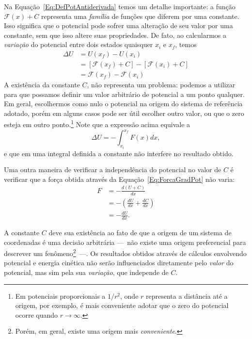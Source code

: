 Na Equação~\eqref{Eq:DefPotAntiderivada} temos um detalhe importante: a função $\mathcal{F}(x) + C$ representa uma \emph{família} de funções que diferem por uma constante. Isso significa que o potencial pode sofrer uma alteração de seu valor por uma constante, sem que isso altere suas propriedades. De fato, ao calcularmos a \emph{variação} do potencial entre dois estados quaisquer $x_i$ e $x_f$, temos
\begin{align}
    \Delta U &= U(x_f) - U(x_i) \\
    &= [\mathcal{F}(x_f) + C] - [\mathcal{F}(x_i) + C] \\
    &= \mathcal{F}(x_f) - \mathcal{F}(x_i)
\end{align}
%
A existência da constante $C$, não representa um problema: podemos a utilizar para que possamos definir um valor arbitrário de potencial a um ponto qualquer. Em geral, escolhermos como nulo o potencial na origem do sistema de referência adotado, porém em alguns casos pode ser útil escolher outro valor, ou que o zero esteja em outro ponto.\footnote{Em potenciais proporcionais a $1/r^2$, onde $r$ representa a distância até a origem, por exemplo, é mais conveniente adotar que o zero do potencial ocorre quando $r \to \infty$.} Note que a expressão acima equivale a
\begin{equation}
  \Delta U = - \int_{x_i}^{x_f} F(x) dx,
\end{equation}
%
e que em uma integral definida a constante não interfere no resultado obtido.

Uma outra maneira de verificar a independência do potencial no valor de $C$ é verificar que a força obtida através da Equação~\eqref{Eq:ForcaGradPot} não varia:
\begin{align}
  F &= - \frac{d(U+C)}{dx} \\
  &= -\left(\frac{dU}{dx} + \frac{dC}{dx}\right) \\
  &= -\frac{dU}{dx}.
\end{align}

A constante $C$ deve sua existência ao fato de que a origem de um sistema de coordenadas é uma decisão arbitrária ---~não existe uma origem preferencial para descrever um fenômeno\footnote{Porém, em geral, existe uma origem mais \emph{conveniente}.}~---. Os resultados obtidos através de cálculos envolvendo potencial e energia cinética não serão influenciados diretamente pelo \emph{valor} do potencial, mas sim pela sua \emph{variação}, que independe de $C$.

